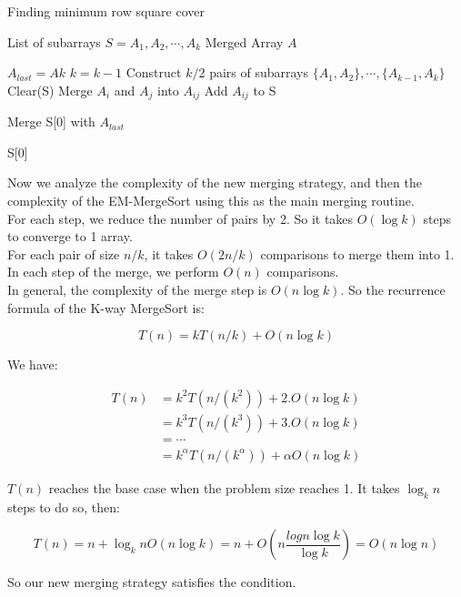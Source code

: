 \begin{algorithm}[h]
  \caption{Finding minimum row square cover}
  \label{alg:merge}
  \begin{algorithmic}
    \Require List of subarrays $S = {A_1, A_2, \cdots, A_k}$
    \Ensure Merged Array $A$

  \State $A_{last} = A{k}$
  \State $k = k - 1$
  \EndIf
  \State Construct $k/2$ pairs of subarrays $\{A_1, A_2\},\cdots, \{A_{k - 1}, A_k\}$
  \State Clear(S)
  \State Merge $A_i$ and $A_j$ into $A_{ij}$
  \State Add $A_{ij}$ to S
  \EndFor
  \EndWhile

  \State Merge S[0] with $A_{last}$
  \EndIf

  \Return S[0]
\end{algorithmic}
\end{algorithm}

Now we analyze the complexity of the new merging strategy, and then the complexity of the EM-MergeSort using this as the main merging routine. \\

For each step, we reduce the number of pairs by 2. So it takes $O(\log k)$ steps to converge to 1 array.\\ 

For each pair of size $n/k$, it takes $O(2n/k)$ comparisons to merge them into 1. In each step of the merge, we perform $O(n)$ comparisons.\\

In general, the complexity of the merge step is $O(n\log k)$. So the recurrence formula of the K-way MergeSort is:

$$T(n) = kT(n/k) + O(n\log k)$$

We have:

\begin{equation*}
\begin{aligned}
T(n) &= k^2 T(n/(k^2)) + 2.O(n\log k) \\
&= k^3 T(n/(k^3)) + 3.O(n\log k) \\
&= \cdots \\
&= k^\alpha T(n/(k^\alpha)) + \alpha O(n\log k)
\end{aligned}
\end{equation*}

$T(n)$ reaches the base case when the problem size reaches 1. It takes $\log_k n$ steps to do so, then:

$$T(n) = n + \log_k n O(n\log k) = n + O(n\frac{log n\log k}{\log k}) = O(n\log n)$$

So our new merging strategy satisfies the condition.

